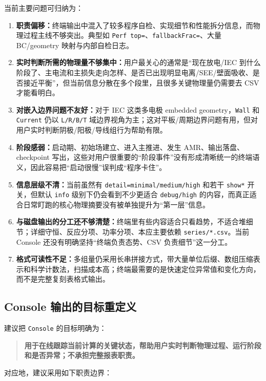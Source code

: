 \documentclass[11pt,a4paper]{ctexart}
\newcommand{\code}[1]{\texttt{#1}}
\begin{document}
当前主要问题可归纳为：

\begin{enumerate}
  \item \textbf{职责偏移：}终端输出中混入了较多程序自检、实现细节和性能拆分信息，而物理过程主线不够突出。典型如 \code{Perf top=}、\code{fallbackFrac=}、大量 BC/geometry 映射与内部自检日志。
  \item \textbf{实时判断所需的物理量不够集中：}用户最关心的通常是``现在放电/IEC 到什么阶段了、主电流和主损失走向怎样、是否已出现明显电离/SEE/壁面吸收、是否接近平衡''，但当前信息分散在多个段里，且很多关键物理量仍需要去 CSV 才能看明白。
  \item \textbf{对嵌入边界问题不友好：}对于 IEC 这类多电极 embedded geometry，\code{Wall} 和 \code{Current} 仍以 \code{L/R/B/T} 域边界视角为主；这对平板/周期边界问题有用，但对用户实时判断阴极/阳极/导线组行为帮助有限。
  \item \textbf{阶段感弱：}启动期、初始场建立、进入主推进、发生 AMR、输出落盘、checkpoint 写出，这些对用户很重要的``阶段事件''没有形成清晰统一的终端语义，因此容易把``启动很慢''误判成``程序卡住''。
  \item \textbf{信息层级不清：}当前虽然有 \code{detail=minimal/medium/high} 和若干 \code{show*} 开关，但默认 \code{info} 级别下仍会看到不少更适合 \code{debug/high} 的内容，而真正适合日常盯跑的核心物理摘要没有被单独提升为``第一层''信息。
  \item \textbf{与磁盘输出的分工还不够清楚：}终端里有些内容适合只看趋势，不适合堆细节；详细守恒、反应分项、功率分项、本应主要依赖 \code{series/*.csv}。当前 Console 还没有明确坚持``终端负责态势、CSV 负责细节''这一分工。
  \item \textbf{格式可读性不足：}多组量仍采用长串拼接方式，带大量单位后缀、数组压缩表示和科学计数法，扫描成本高；终端最需要的是快速定位异常值和变化方向，而不是完整复刻表格式输出。
\end{enumerate}

\subsection{Console 输出的目标重定义}

建议把 \code{Console} 的目标明确为：

\begin{quote}
\textbf{用于在线跟踪当前计算的关键状态，帮助用户实时判断物理过程、运行阶段和是否异常；不承担完整报表职责。}
\end{quote}

对应地，建议采用如下职责边界：
\end{document}
